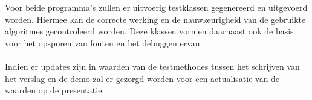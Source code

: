 
\\
\\
Voor beide programma's zullen er uitvoerig testklassen gegenereerd en uitgevoerd worden. Hiermee kan de correcte werking en de nauwkeurigheid van de gebruikte algoritmes gecontroleerd worden. Deze klassen vormen daarnaast ook de basis voor het opsporen van fouten en het debuggen ervan.
\\
\\
Indien er updates zijn in waarden van de testmethodes tussen het schrijven van het verslag en de demo zal er gezorgd worden voor een actualisatie van de waarden op de presentatie. 